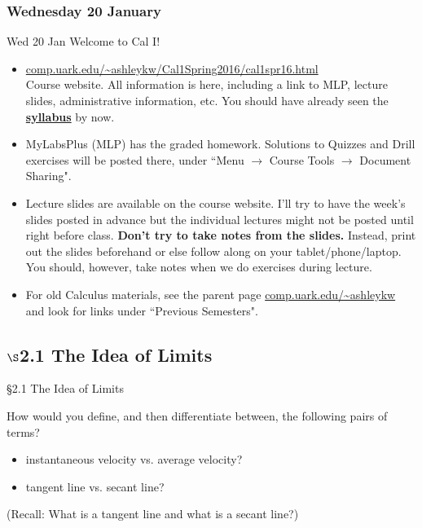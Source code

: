 \documentclass[cal1spr16Lectures.tex]{subfiles}
\begin{document}

\subsubsection{\bf Wednesday 20 January}
\begin{frame}[allowframebreaks]{Wed 20 Jan}
Welcome to Cal I!
\begin{itemize}\footnotesize
\item \href{http://comp.uark.edu/~ashleykw/Cal1Spring2016/cal1spr16.html}{\alert{\url{comp.uark.edu/~ashleykw/Cal1Spring2016/cal1spr16.html}}} \\
	Course website.  All information is here, including a link to MLP, lecture slides, administrative information, etc.  You should have already seen the 
	\href{http://comp.uark.edu/~ashleykw/Cal1Spring2016/syllabusCal1Spring2016.pdf}{\alert{\textbf{syllabus}}}
	by now.
\item MyLabsPlus (MLP) has the graded homework.   Solutions to Quizzes and Drill exercises will be posted there, under ``Menu $\to$ Course Tools $\to$ Document Sharing".  
\framebreak 
\item Lecture slides are available on the course website.  I'll try to have the week's slides posted in advance but the individual lectures might not be posted until right before class.  \textbf{Don't try to take notes from the slides.}  Instead, print out the slides beforehand or else follow along on your tablet/phone/laptop.  You should, however, take notes when we do exercises during lecture.%
\item For old Calculus materials, see the parent page \url{comp.uark.edu/~ashleykw} and look for links under ``Previous Semesters".  
\end{itemize}
\end{frame}

\subsection[2.1 The Idea of Limits]{$\S$2.1 The Idea of Limits}

\begin{frame}{\S 2.1 The Idea of Limits}
\begin{que} How would you define, and then differentiate between, the following pairs of terms? 
\begin{itemize}
\item instantaneous velocity vs. average velocity?
\item tangent line vs. secant line? 
\end{itemize}
\end{que}

(Recall: What is a tangent line and what is a secant line?)
\end{frame}
\end{document}
